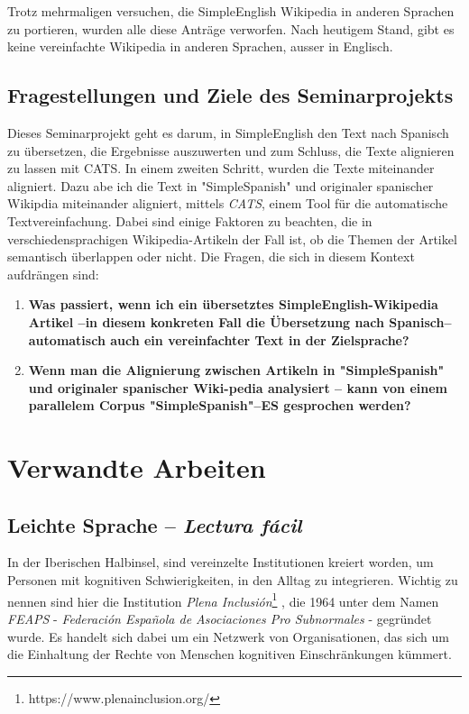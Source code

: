 \documentclass[11pt]{article}
\begin{document}
Trotz mehrmaligen versuchen, die SimpleEnglish Wikipedia in anderen Sprachen zu portieren, wurden alle diese Anträge verworfen. Nach heutigem Stand, gibt es keine vereinfachte Wikipedia in anderen Sprachen, ausser in Englisch.
\subsection{Fragestellungen und Ziele des Seminarprojekts}

Dieses Seminarprojekt geht es darum, in SimpleEnglish den Text nach Spanisch zu übersetzen, die Ergebnisse auszuwerten  und zum Schluss, die Texte alignieren zu lassen mit CATS. 
\newline In einem zweiten Schritt, wurden die Texte miteinander aligniert. Dazu abe ich die Text in "SimpleSpanish" und originaler spanischer Wikipdia miteinander aligniert, mittels \textit{CATS}, einem Tool für die automatische Textvereinfachung. Dabei sind einige Faktoren zu beachten, die in verschiedensprachigen Wikipedia-Artikeln der Fall ist, ob die Themen der Artikel semantisch überlappen oder nicht.
\newline\newline Die Fragen, die sich in diesem Kontext aufdrängen sind: 
\newline\begin{enumerate}
\item \textbf{Was passiert, wenn ich ein übersetztes SimpleEnglish-Wikipedia Artikel --in diesem konkreten Fall die Übersetzung nach Spanisch-- automatisch auch ein vereinfachter Text in der Zielsprache? }
\item \textbf{Wenn man die Alignierung zwischen Artikeln in "SimpleSpanish" und originaler spanischer Wiki-pedia analysiert -- kann von einem parallelem Corpus "SimpleSpanish"--ES gesprochen werden? }
\end{enumerate}

\section{Verwandte Arbeiten}
\subsection{Leichte Sprache -- \textit{Lectura fácil}}
In der Iberischen Halbinsel, sind vereinzelte Institutionen kreiert worden, um Personen mit kognitiven Schwierigkeiten, in den Alltag zu integrieren. Wichtig zu nennen sind hier die Institution \textit{Plena Inclusión}\footnote{https://www.plenainclusion.org/} , die 1964 unter dem Namen \textit{FEAPS} - \textit{Federación Española de Asociaciones Pro Subnormales} - gegründet wurde. Es handelt sich dabei um ein Netzwerk von Organisationen, das sich um die Einhaltung der Rechte von Menschen kognitiven Einschränkungen kümmert.
\end{document}
